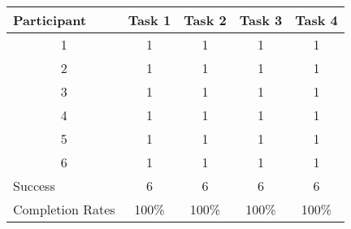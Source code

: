 \documentclass[../../UsabilityReport.tex]{subfiles}
\begin{document}
\begin{table}[htb]
	\centering
	\begin{tabular}{ccccc}
		\cline{2-5}
		\multicolumn{1}{l|}{Participant}     & \multicolumn{1}{l|}{Task 1} & \multicolumn{1}{l|}{Task 2} & \multicolumn{1}{l|}{Task 3} & \multicolumn{1}{l|}{Task 4} \\ \hline
		\multicolumn{1}{|c|}{1}              & \multicolumn{1}{c|}{1}      & \multicolumn{1}{c|}{1}      & \multicolumn{1}{c|}{1}      & \multicolumn{1}{c|}{1}      \\ \hline
		\multicolumn{1}{|c|}{2}              & \multicolumn{1}{c|}{1}      & \multicolumn{1}{c|}{1}      & \multicolumn{1}{c|}{1}      & \multicolumn{1}{c|}{1}      \\ \hline
		\multicolumn{1}{|c|}{3}              & \multicolumn{1}{c|}{1}      & \multicolumn{1}{c|}{1}      & \multicolumn{1}{c|}{1}      & \multicolumn{1}{c|}{1}      \\ \hline
		\multicolumn{1}{|c|}{4}              & \multicolumn{1}{c|}{1}      & \multicolumn{1}{c|}{1}      & \multicolumn{1}{c|}{1}      & \multicolumn{1}{c|}{1}      \\ \hline
		\multicolumn{1}{|c|}{5}              & \multicolumn{1}{c|}{1}      & \multicolumn{1}{c|}{1}      & \multicolumn{1}{c|}{1}      & \multicolumn{1}{c|}{1}      \\ \hline
		\multicolumn{1}{|c|}{6}              & \multicolumn{1}{c|}{1}      & \multicolumn{1}{c|}{1}      & \multicolumn{1}{c|}{1}      & \multicolumn{1}{c|}{1}      \\ \hline
		\multicolumn{1}{|l|}{Success}        & \multicolumn{1}{c|}{6}      & \multicolumn{1}{c|}{6}      & \multicolumn{1}{c|}{6}      & \multicolumn{1}{c|}{6}      \\ \hline
		\multicolumn{1}{l}{Completion Rates} & 100\%                       & 100\%                       & 100\%                       & 100\%                       \\ \hline
	\end{tabular}
\end{table}
\end{document}
